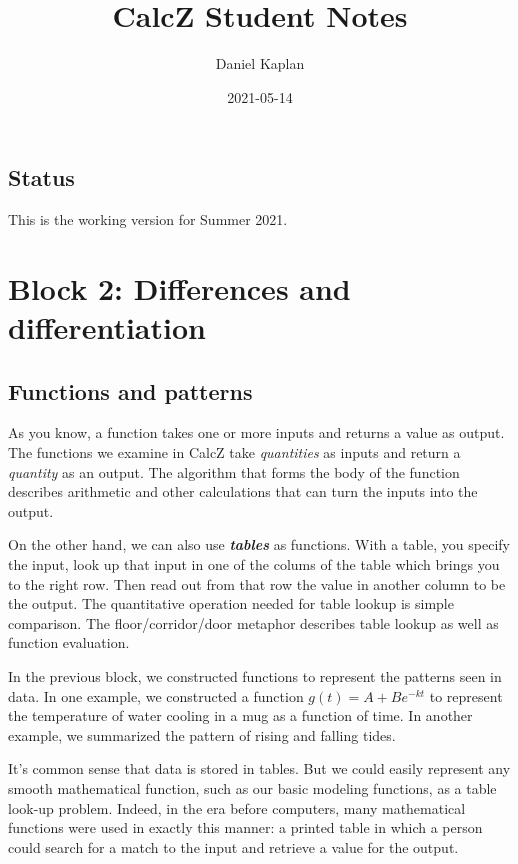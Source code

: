 \documentclass[
]{book}
\title{CalcZ Student Notes}
\author{Daniel Kaplan}
\date{2021-05-14}
\begin{document}
\maketitle

{
\setcounter{tocdepth}{1}
\tableofcontents
}
\hypertarget{status}{%
\chapter*{Status}\label{status}}

This is the working version for Summer 2021.

\hypertarget{part-block-2-differences-and-differentiation}{%
\part{Block 2: Differences and differentiation}\label{part-block-2-differences-and-differentiation}}

\hypertarget{functions-and-patterns}{%
\chapter{Functions and patterns}\label{functions-and-patterns}}

As you know, a function takes one or more inputs and returns a value as output. The functions we examine in CalcZ take \emph{quantities} as inputs and return a \emph{quantity} as an output.
The algorithm that forms the body of the function describes arithmetic and other calculations that can turn the inputs into the output.

On the other hand, we can also use \textbf{\emph{tables}} as functions. With a table, you specify the input, look up that input in one of the colums of the table which brings you to the right row. Then read out from that row the value in another column to be the output. The quantitative operation needed for table lookup is simple comparison. The floor/corridor/door metaphor describes table lookup as well as function evaluation.

In the previous block, we constructed functions to represent the patterns seen in data. In one example, we constructed a function \(g(t) = A + B e^{-k t}\) to represent the temperature of water cooling in a mug as a function of time. In another example, we summarized the pattern of rising and falling tides.

It's common sense that data is stored in tables. But we could easily represent any smooth mathematical function, such as our basic modeling functions, as a table look-up problem. Indeed, in the era before computers, many mathematical functions were used in exactly this manner: a printed table in which a person could search for a match to the input and retrieve a value for the output.
\end{document}
